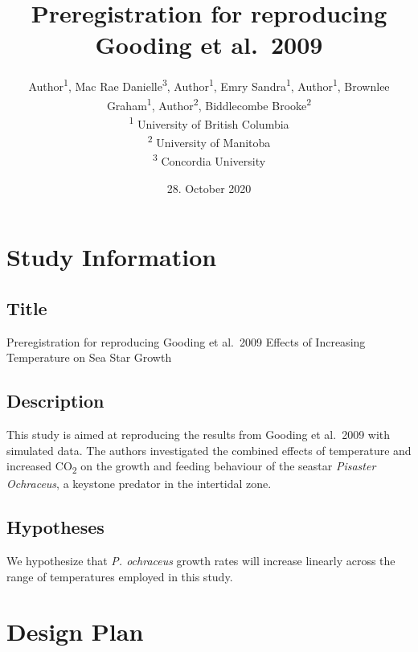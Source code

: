 \documentclass[]{article}
\title{Preregistration for reproducing Gooding et al.~2009}
\author{
          Author\textsuperscript{1},
          Mac Rae Danielle\textsuperscript{3},
          Author\textsuperscript{1},
          Emry Sandra\textsuperscript{1},
          Author\textsuperscript{1},
          Brownlee Graham\textsuperscript{1},
          Author\textsuperscript{2},
          Biddlecombe Brooke\textsuperscript{2}          \\ \vspace{0.5cm}
              \textsuperscript{1} University of British Columbia\\
              \textsuperscript{2} University of Manitoba\\
              \textsuperscript{3} Concordia University      }
\date{28. October 2020}
\newcounter{question}
\begin{document}
\maketitle
\vspace{2pc}


\newcommand\Question[2]{%
   \leavevmode\par
   \stepcounter{question}
   \noindent
   \textbf{\thequestion. #1}. #2\par}

\newcommand\Answer[1]{%
    \noindent
    \textit{Registered response}: #1\par}
    
\hypertarget{study-information}{%
\section{Study Information}\label{study-information}}

\hypertarget{title}{%
\subsection{Title}\label{title}}

Preregistration for reproducing Gooding et al.~2009 Effects of
Increasing Temperature on Sea Star Growth

\hypertarget{description}{%
\subsection{Description}\label{description}}

This study is aimed at reproducing the results from Gooding et al.~2009
with simulated data. The authors investigated the combined effects of
temperature and increased CO\textsubscript{2} on the growth and feeding
behaviour of the seastar \emph{Pisaster Ochraceus}, a keystone predator
in the intertidal zone.

\hypertarget{hypotheses}{%
\subsection{Hypotheses}\label{hypotheses}}

We hypothesize that \emph{P. ochraceus} growth rates will increase
linearly across the range of temperatures employed in this study.

\hypertarget{design-plan}{%
\section{Design Plan}\label{design-plan}}
\end{document}
